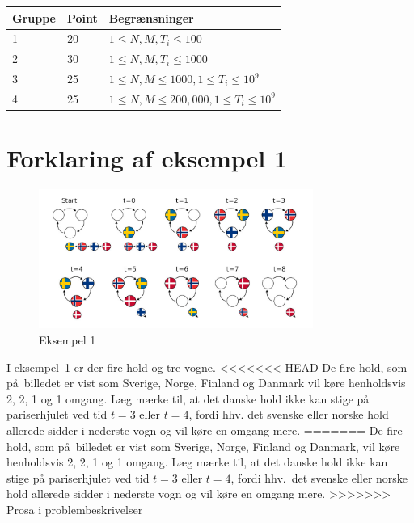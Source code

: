 \noindent
\begin{tabular}{l l l}
Gruppe & Point & Begrænsninger \\ \hline
1     & 20    & $1 \le N, M, T_i \le 100$ \\ 
2     & 30    & $1 \le N, M, T_i \le 1000$ \\
3     & 25    & $1 \le N, M \le 1000, 1 \le T_i \le 10^9$ \\
4     & 25    & $1 \le N, M \le 200,000, 1 \le T_i \le 10^9$ 
\end{tabular}

\section*{Forklaring af eksempel 1}

\begin{figure}[h]
	\centering
\includegraphics[width=0.8\textwidth]{sample1}
\caption{Eksempel 1}
\end{figure}

I eksempel~1 er der fire hold og tre vogne.
<<<<<<< HEAD
De fire hold, som på billedet er vist som Sverige, Norge, Finland og Danmark vil køre henholdsvis 2, 2, 1 og 1 omgang.
Læg mærke til, at det danske hold ikke kan stige på pariserhjulet ved tid $t=3$ eller $t=4$, fordi hhv. det svenske eller norske hold allerede sidder i nederste vogn og vil køre en omgang mere.
=======
De fire hold, som på billedet er vist som Sverige, Norge, Finland og Danmark, vil køre henholdsvis 2, 2, 1 og 1 omgang.
Læg mærke til, at det danske hold ikke kan stige på pariserhjulet ved tid $t=3$ eller $t=4$, fordi hhv.\ det svenske eller norske hold allerede sidder i nederste vogn og vil køre en omgang mere.
>>>>>>> Prosa i problembeskrivelser
